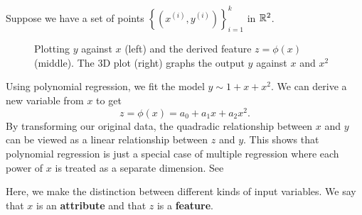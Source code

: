 \begin{example}
    Suppose we have a set of points \(\left\{\left(x^{(i)}, y^{(i)}\right)\right\}_{i=1}^{k}\) in \(\mathbb{R}^2\).
    \begin{figure}
        \centering
        
        \caption{Plotting \(y\) against \(x\) (left) and the derived feature \(z = \phi(x)\) (middle). The 3D plot (right) graphs the output \(y\) against \(x\) and \(x^2\)}
        \label{fig:feature-map}
    \end{figure}
    Using polynomial regression, we fit the model \(y \sim 1 + x + x^2\).
    We can derive a new variable from \(x\) to get \[z = \phi(x) = a_0 + a_1 x + a_2 x^2.\]
    By transforming our original data, the quadradic relationship between \(x\) and \(y\) can be viewed as a linear relationship between \(z\) and \(y\).
    This shows that polynomial regression is just a special case of multiple regression where each power of \(x\) is treated as a separate dimension.
    See 

    Here, we make the distinction between different kinds of input variables.
    We say that \(x\) is an \textbf{attribute} and that \(z\) is a \textbf{feature}.
\end{example}